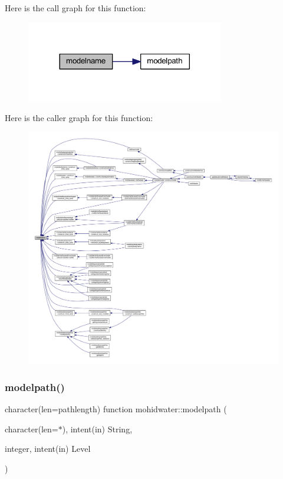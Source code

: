 Here is the call graph for this function\+:\nopagebreak
\begin{figure}[H]
\begin{center}
\leavevmode
\includegraphics[width=245pt]{_main_8_f90_af0ae0b978e6573bc461573aa66062e83_cgraph}
\end{center}
\end{figure}
Here is the caller graph for this function\+:\nopagebreak
\begin{figure}[H]
\begin{center}
\leavevmode
\includegraphics[width=350pt]{_main_8_f90_af0ae0b978e6573bc461573aa66062e83_icgraph}
\end{center}
\end{figure}
\mbox{\label{_main_8_f90_ada5b220b45dcba73a75264dcde43e3bd}} 
\subsubsection{\texorpdfstring{modelpath()}{modelpath()}}
{\footnotesize\ttfamily character(len=pathlength) function mohidwater\+::modelpath (\begin{DoxyParamCaption}\item[{character(len=$\ast$), intent(in)}]{String,  }\item[{integer, intent(in)}]{Level }\end{DoxyParamCaption})}

